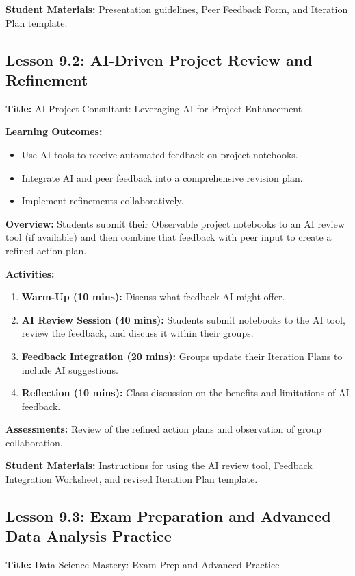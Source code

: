 \documentclass{tufte-book}
\begin{document}
\medskip
\textbf{Student Materials:}  
Presentation guidelines, Peer Feedback Form, and Iteration Plan template.

\subsection{Lesson 9.2: AI-Driven Project Review and Refinement}
\textbf{Title:} AI Project Consultant: Leveraging AI for Project Enhancement

\medskip
\textbf{Learning Outcomes:}
\begin{itemize}[leftmargin=*, label={\textbullet}]
    \item Use AI tools to receive automated feedback on project notebooks.
    \item Integrate AI and peer feedback into a comprehensive revision plan.
    \item Implement refinements collaboratively.
\end{itemize}

\medskip
\textbf{Overview:}  
Students submit their Observable project notebooks to an AI review tool (if available) and then combine that feedback with peer input to create a refined action plan.

\medskip
\textbf{Activities:}
\begin{enumerate}[label=\arabic*.]
    \item \textbf{Warm-Up (10 mins):} Discuss what feedback AI might offer.
    \item \textbf{AI Review Session (40 mins):} Students submit notebooks to the AI tool, review the feedback, and discuss it within their groups.
    \item \textbf{Feedback Integration (20 mins):} Groups update their Iteration Plans to include AI suggestions.
    \item \textbf{Reflection (10 mins):} Class discussion on the benefits and limitations of AI feedback.
\end{enumerate}

\medskip
\textbf{Assessments:}  
Review of the refined action plans and observation of group collaboration.

\medskip
\textbf{Student Materials:}  
Instructions for using the AI review tool, Feedback Integration Worksheet, and revised Iteration Plan template.

\subsection{Lesson 9.3: Exam Preparation and Advanced Data Analysis Practice}
\textbf{Title:} Data Science Mastery: Exam Prep and Advanced Practice
\end{document}
